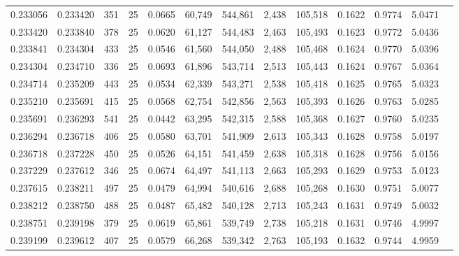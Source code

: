 \begin{tabular}{rrrrrrrrrrrrr}
0.233056 & 0.233420 &   351 &  25 &                                     0.0665 &  60,749 & 544,861 &   2,438 & 105,518 & 0.1622 & 0.9774 & 5.0471 \\
0.233420 & 0.233840 &   378 &  25 &                                     0.0620 &  61,127 & 544,483 &   2,463 & 105,493 & 0.1623 & 0.9772 & 5.0436 \\
0.233841 & 0.234304 &   433 &  25 &                                     0.0546 &  61,560 & 544,050 &   2,488 & 105,468 & 0.1624 & 0.9770 & 5.0396 \\
0.234304 & 0.234710 &   336 &  25 &                                     0.0693 &  61,896 & 543,714 &   2,513 & 105,443 & 0.1624 & 0.9767 & 5.0364 \\
0.234714 & 0.235209 &   443 &  25 &                                     0.0534 &  62,339 & 543,271 &   2,538 & 105,418 & 0.1625 & 0.9765 & 5.0323 \\
0.235210 & 0.235691 &   415 &  25 &                                     0.0568 &  62,754 & 542,856 &   2,563 & 105,393 & 0.1626 & 0.9763 & 5.0285 \\
0.235691 & 0.236293 &   541 &  25 &                                     0.0442 &  63,295 & 542,315 &   2,588 & 105,368 & 0.1627 & 0.9760 & 5.0235 \\
0.236294 & 0.236718 &   406 &  25 &                                     0.0580 &  63,701 & 541,909 &   2,613 & 105,343 & 0.1628 & 0.9758 & 5.0197 \\
0.236718 & 0.237228 &   450 &  25 &                                     0.0526 &  64,151 & 541,459 &   2,638 & 105,318 & 0.1628 & 0.9756 & 5.0156 \\
0.237229 & 0.237612 &   346 &  25 &                                     0.0674 &  64,497 & 541,113 &   2,663 & 105,293 & 0.1629 & 0.9753 & 5.0123 \\
0.237615 & 0.238211 &   497 &  25 &                                     0.0479 &  64,994 & 540,616 &   2,688 & 105,268 & 0.1630 & 0.9751 & 5.0077 \\
0.238212 & 0.238750 &   488 &  25 &                                     0.0487 &  65,482 & 540,128 &   2,713 & 105,243 & 0.1631 & 0.9749 & 5.0032 \\
0.238751 & 0.239198 &   379 &  25 &                                     0.0619 &  65,861 & 539,749 &   2,738 & 105,218 & 0.1631 & 0.9746 & 4.9997 \\
0.239199 & 0.239612 &   407 &  25 &                                     0.0579 &  66,268 & 539,342 &   2,763 & 105,193 & 0.1632 & 0.9744 & 4.9959 \\

\end{tabular}
